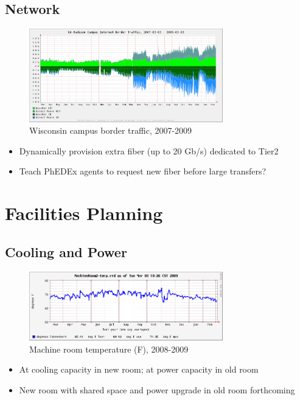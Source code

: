 \documentclass{beamer}
\begin{document}
\subsection{Network}
\begin{frame}
\begin{figure}
    \includegraphics[width=0.75\textwidth]{Graphics/network-all-2yr.png}
    \caption{Wisconsin campus border traffic, 2007-2009}
\end{figure}

\begin{itemize}
    \item Dynamically provision extra fiber (up to 20 Gb/s) dedicated to Tier2
    \item Teach PhEDEx agents to request new fiber before large transfers?
\end{itemize}
\end{frame}

\section{Facilities Planning}
\subsection{Cooling and Power}
\begin{frame}
\begin{figure}
    \includegraphics[width=0.75\textwidth]{Graphics/mr2-temp-1yr.png}
    \caption{Machine room temperature (F), 2008-2009}
\end{figure}

\begin{itemize}
    \item At cooling capacity in new room; at power capacity in old room
    \item New room with shared space and power upgrade in old room forthcoming
\end{itemize}
\end{frame}
\end{document}
